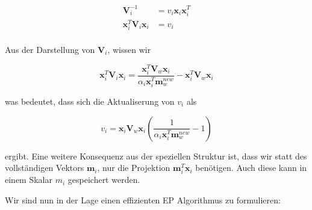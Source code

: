 \documentclass[12pt,a4paper]{scrartcl}
\numberwithin{equation}{section}
\begin{document}
{  \begin{equation}
   \begin{split}
   \mathbf{V}_i^{-1} &= v_i \mathbf{x}_i \mathbf{x}_i^T \\
   \mathbf{x}_i^T \mathbf{V}_i \mathbf{x}_i &= v_i \\
  \end{split}
  \end{equation}
  
  Aus der Darstellung von $\mathbf{V}_i$, wissen wir 
  
  \begin{equation}
   \mathbf{x}_i^T \mathbf{V}_i \mathbf{x}_i =  \frac{\mathbf{x}_i^T \mathbf{V}_w \mathbf{x}_i}{\alpha_i \mathbf{x}_i^T \mathbf{m}_w^{new}} - \mathbf{x}_i^T \mathbf{V}_w \mathbf{x}_i
  \end{equation}

  was bedeutet, dass sich die Aktualiserung von $v_i$ als 
  
  \begin{equation}
   v_i = \mathbf{x}_i \mathbf{V}_w \mathbf{x}_i ( \frac{ 1 }{ \alpha_i \mathbf{x}_i^T \mathbf{m}_w^{new} } - 1 ) 
  \end{equation}
  
  ergibt. Eine weitere Konsequenz aus der speziellen Struktur ist, dass wir statt des vollständigen Vektors
  $\mathbf{m}_i$, nur die Projektion $\mathbf{m}_i^T \mathbf{x}_i$ benötigen. Auch diese kann in einem Skalar $m_i$ 
  gespeichert werden.
  
  Wir sind nun in der Lage einen effizienten EP Algorithmus zu formulieren: 
  
}
\end{document}
